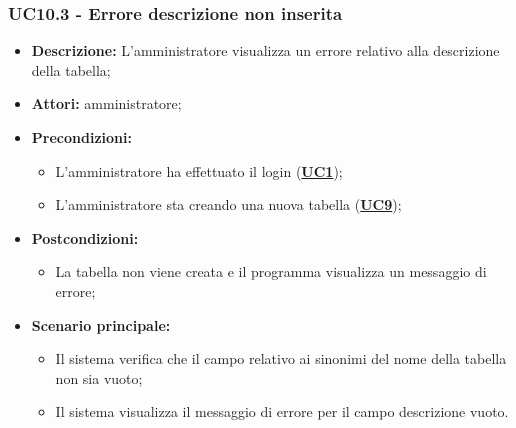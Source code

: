 \subsubsection{UC10.3 - Errore descrizione non inserita}
\label{sec:UC10.3}
\begin{itemize}
	\item \textbf{Descrizione:} L’amministratore visualizza un errore relativo alla descrizione della tabella;
	\item \textbf{Attori:} amministratore;
	\item \textbf{Precondizioni:} 
	\begin{itemize}
		\item L’amministratore ha effettuato il login (\hyperref[sec:UC1]{\textbf{UC1}});
		\item L’amministratore sta creando una nuova tabella (\hyperref[sec:UC9]{\textbf{UC9}});
	\end{itemize}
	\item \textbf{Postcondizioni:} 
	\begin{itemize}
		\item La tabella non viene creata e il programma visualizza un messaggio di errore;
	\end{itemize}
	\item \textbf{Scenario principale:} 
	\begin{itemize}
		\item Il sistema verifica che il campo relativo ai sinonimi del nome della tabella non sia vuoto;
		\item Il sistema visualizza il messaggio di errore per il campo descrizione vuoto.
	\end{itemize}
\end{itemize}

